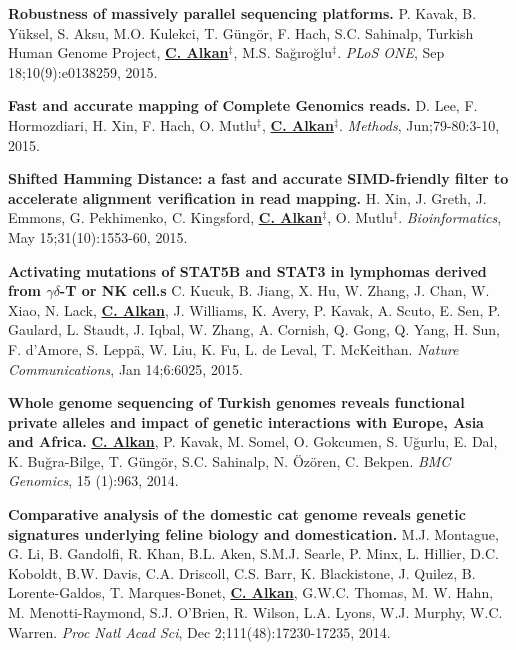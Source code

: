 \documentclass[margin,line]{res}
\begin{document}
\begin{resume}
  \vspace{-.2cm}        
  {\bf Robustness of massively parallel sequencing platforms.}
  P. Kavak, B. Yüksel, S. Aksu, M.O. Kulekci, T. Güngör, F. Hach, S.C. Sahinalp, Turkish Human Genome Project, {\bf {\underline {C. Alkan}}}$^\ddag$,
  M.S. Sağıroğlu$^\ddag$.    
  {\em PLoS ONE},  Sep 18;10(9):e0138259, 2015.  

  \vspace{-.2cm}        
  {\bf Fast and accurate mapping of Complete Genomics reads.}
  D. Lee, F. Hormozdiari, H. Xin, F. Hach, O. Mutlu$^\ddag$,  {\bf {\underline {C. Alkan}}}$^\ddag$.
  {\em Methods}, Jun;79-80:3-10, 2015. 

  \vspace{-.2cm}        
  {\bf Shifted Hamming Distance: a fast and accurate SIMD-friendly filter to accelerate alignment verification in read mapping.} H. Xin, J. Greth, J. Emmons, 
G. Pekhimenko, C. Kingsford, {\bf {\underline{C. Alkan}}}$^\ddag$,  O. Mutlu$^\ddag$. {\em Bioinformatics},  May 15;31(10):1553-60, 2015.

\clearpage
  \vspace{-.2cm}        
  {\bf Activating mutations of STAT5B and STAT3 in lymphomas derived from $\gamma\delta$-T or NK cell.s}
   C. Kucuk, B. Jiang, X. Hu, W. Zhang, J. Chan, W. Xiao, N. Lack,   {\bf {\underline {C. Alkan}}},  J. Williams, K. Avery, P. Kavak, A. Scuto, E. Sen,  P. Gaulard, L. Staudt, J. Iqbal,  W. Zhang,  A. Cornish, Q. Gong, Q.  Yang, H. Sun, F. d'Amore, S. Leppä, W. Liu, K. Fu, L. de Leval, T. McKeithan.
 {\em Nature Communications}, Jan 14;6:6025, 2015.


  \vspace{-.2cm}        
  {\bf Whole genome sequencing of Turkish genomes reveals functional private alleles and impact of genetic interactions with Europe, Asia and Africa.}
  {\bf {\underline {C. Alkan}}}, P. Kavak, M. Somel, O. Gokcumen, S. Uğurlu, E. Dal, K. Buğra-Bilge,  T. Güngör, S.C. Sahinalp, N. Özören, C. Bekpen.
  {\em BMC Genomics}, 15 (1):963, 2014.

  \vspace{-.2cm}        
  {\bf Comparative analysis of the domestic cat genome reveals genetic signatures underlying feline biology and domestication.}
  M.J. Montague, G. Li, B. Gandolfi, R. Khan, B.L. Aken, S.M.J. Searle, P. Minx, L. Hillier, D.C. Koboldt, B.W. Davis, C.A. Driscoll, 
  C.S. Barr, K. Blackistone, J. Quilez, B. Lorente-Galdos, T. Marques-Bonet, {\bf {\underline {C. Alkan}}}, G.W.C. Thomas, M. W. Hahn, M. Menotti-Raymond, 
  S.J. O’Brien, R. Wilson, L.A. Lyons, W.J. Murphy, W.C. Warren. {\em Proc Natl Acad Sci}, Dec 2;111(48):17230-17235, 2014.


\end{resume}
\end{document}
